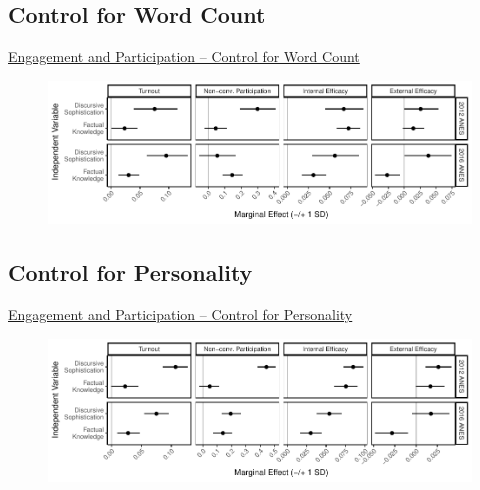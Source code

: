 \subsection{Control for Word Count}
\begin{frame}{\hyperlink{engagement}{Engagement and Participation -- Control for Word Count}}\label{engagement_lwc}
  \begin{figure}
  \includegraphics[width=\textwidth]{../fig/knoweff_lwc.pdf}
  \end{figure}
\end{frame}

\subsection{Control for Personality}
\begin{frame}{\hyperlink{engagement}{Engagement and Participation -- Control for Personality}}\label{engagement_personality}
  \begin{figure}
  \includegraphics[width=\textwidth]{../fig/knoweff_personality.pdf}
  \end{figure}
\end{frame}

